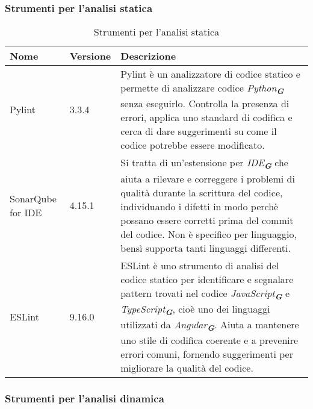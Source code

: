 \subsubsection{Strumenti per l’analisi statica}
\label{subsec:strumenti_analisi_statica}
\begin{table}[h!]
    \centering
    \renewcommand{\arraystretch}{1.6} %
    \begin{tabularx}{\textwidth}{|p{2cm}|p{2cm}|X|} \hline
    \rowcolor[HTML]{FFD700} 
    \textbf{Nome} & \textbf{Versione} & \textbf{Descrizione} \\ \hline
    Pylint & 3.3.4 & Pylint è un analizzatore di codice statico e permette di
                    analizzare codice \emph{Python}\textsubscript{\textbf{\textit{G}}} senza eseguirlo. Controlla la presenza
                    di errori, applica uno standard di codifica e cerca di dare
                    suggerimenti su come il codice potrebbe essere modificato. \\ \hline
    SonarQube for IDE & 4.15.1 & Si tratta di un’estensione per \emph{IDE}\textsubscript{\textbf{\textit{G}}} 
                                che aiuta a rilevare
                                e correggere i problemi di qualità durante la scrittura
                                del codice, individuando i difetti in modo perchè possano
                                essere corretti prima del commit del codice. Non è specifico
                                per linguaggio, bensì supporta tanti linguaggi differenti. \\ \hline
    ESLint & 9.16.0 & ESLint è uno strumento di analisi del codice statico per identificare
                    e segnalare pattern trovati nel codice \emph{JavaScript}\textsubscript{\textbf{\textit{G}}}
                    e \emph{TypeScript}\textsubscript{\textbf{\textit{G}}}, cioè uno 
                    dei linguaggi utilizzati da \emph{Angular}\textsubscript{\textbf{\textit{G}}}. Aiuta a mantenere
                    uno stile di codifica
                    coerente e a prevenire errori comuni, fornendo suggerimenti per migliorare
                    la qualità del codice. \\ \hline
    \end{tabularx}
    \caption{Strumenti per l’analisi statica}
\end{table}

\subsubsection{Strumenti per l’analisi dinamica}
\label{subsec:strumenti_analisi_dinamica}

